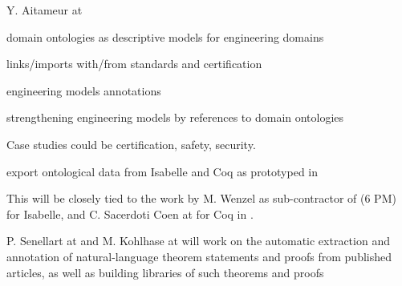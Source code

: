 \begin{workpackage}
\begin{tasklist}
\begin{task}[id=strdomonto,title= Domain Ontologies for Formal Methods in SE,lead=Tou,TouRM=12, SacRM=6]
Y. Aitameur at 
\begin{compactitem}
\item domain ontologies as descriptive models for engineering domains 
\item links/imports with/from standards and certification
\item engineering models annotations
\item strengthening engineering models by references to domain ontologies
\item Case studies could be certification, safety, security.
\end{compactitem}
\end{task} 

\begin{task}[id=strontorepml,title=Ontological Representation of Formal Libraries,lead=Fau,FauRM=12,BolRM=6,SacRM=6]
export ontological data from Isabelle and Coq as prototyped in \cite{ulo}

This will be closely tied to the work by M. Wenzel as sub-contractor of  (6 PM) for Isabelle, and C. Sacerdoti Coen at  for Coq in .
\end{task} 



\begin{task}[id=strtext,title=Ontological Representation of Natural Language Articles,lead=Inr,FauRM=6,InrRM=12]
P. Senellart at  and M. Kohlhase at  will work on the automatic extraction and annotation of natural-language theorem statements and proofs from published articles, as well as building libraries of such theorems and proofs
  
\end{task} 


\end{tasklist}
\end{workpackage}
